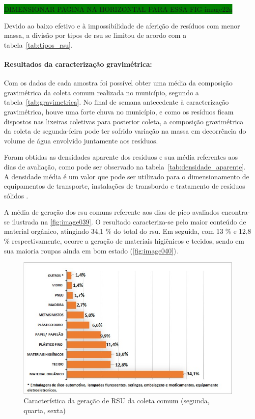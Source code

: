 	\colorbox{green}{DIMENSIONAR PAGINA NA HORIZONTAL PARA ESSA FIG image22a}
	
	Devido ao baixo efetivo e à impossibilidade de aferição de resíduos com menor massa, a divisão por tipos de \gls{rsu} se limitou de acordo com a tabela~\ref{tab:tipos_rsu}.
	
		
	
	
	\paragraph{\textbf{Resultados da caracterização gravimétrica:}}
	
	Com os dados de cada amostra foi possível obter uma média da composição gravimétrica da coleta comum realizada no município, segundo a tabela~\ref{tab:gravimetrica}. No final de semana antecedente à caracterização gravimétrica, houve uma forte chuva no município, e como os resíduos ficam dispostos nas lixeiras coletivas para posterior coleta, a composição gravimétrica da coleta de segunda-feira pode ter sofrido variação na massa em decorrência do volume de água envolvido juntamente aos resíduos.
	
	
	
		
	Foram obtidas as densidades aparente dos resíduos e sua média referentes aos dias de avaliação, como pode ser observado na tabela~\ref{tab:densidade_aparente}. A densidade média é um valor que pode ser utilizado para o dimensionamento de equipamentos de transporte, instalações de transbordo e tratamento de resíduos sólidos \cite{ibam:2001}.
	
	
	
	A média de geração dos \gls{rsu} comuns referente aos dias de pico avaliados encontra-se ilustrada na \autoref{fig:image039}. O resultado caracteriza-se pelo maior conteúdo de material orgânico, atingindo 34,1 \% do total do \gls{rsu}. Em seguida, com 13 \% e 12,8 \% respectivamente, ocorre a geração de materiais higiênicos e tecidos, sendo em sua maioria roupas ainda em bom estado (\autoref{fig:image040}). 
	
	\begin{figure}
		\centering
		\includegraphics[width=0.7\linewidth]{produtos/prodtres/image039}
		\caption{Característica da geração de RSU da coleta comum (segunda, quarta, sexta)}
		\label{fig:image039}
	\end{figure}
	
